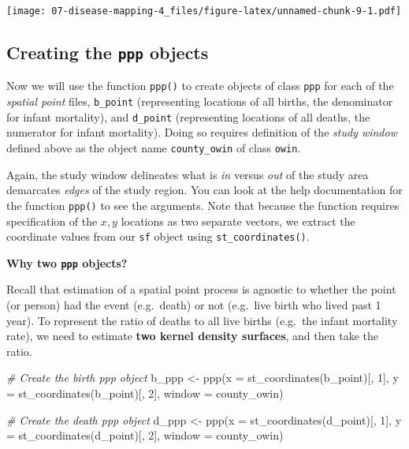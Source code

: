 \documentclass[
]{book}
\newenvironment{Shaded}{\begin{snugshade}}{\end{snugshade}}
\newcommand{\AttributeTok}[1]{\textcolor[rgb]{0.77,0.63,0.00}{#1}}
\newcommand{\CommentTok}[1]{\textcolor[rgb]{0.56,0.35,0.01}{\textit{#1}}}
\newcommand{\DecValTok}[1]{\textcolor[rgb]{0.00,0.00,0.81}{#1}}
\newcommand{\FunctionTok}[1]{\textcolor[rgb]{0.00,0.00,0.00}{#1}}
\newcommand{\NormalTok}[1]{#1}
\newcommand{\OtherTok}[1]{\textcolor[rgb]{0.56,0.35,0.01}{#1}}
\newenvironment{rmdnote}[1]
  {
  \begin{itemize}
  \renewcommand{\labelitemi}{
    \raisebox{-.7\height}[0pt][0pt]{
      {\setkeys{Gin}{width=3em,keepaspectratio}\texttt{[image: images/\#1]}}
    }
  }
  \setlength{\fboxsep}{1em}
  \begin{note}
  \item
  }
  {
  \end{note}
  \end{itemize}
  }
\begin{document}
\texttt{[image: 07-disease-mapping-4\_files/figure-latex/unnamed-chunk-9-1.pdf]}

\hypertarget{creating-the-ppp-objects}{%
\subsection{\texorpdfstring{Creating the \texttt{ppp} objects}{Creating the ppp objects}}\label{creating-the-ppp-objects}}

Now we will use the function \texttt{ppp()} to create objects of class \texttt{ppp} for each of the \emph{spatial point} files, \texttt{b\_point} (representing locations of all births, the denominator for infant mortality), and \texttt{d\_point} (representing locations of all deaths, the numerator for infant mortality). Doing so requires definition of the \emph{study window} defined above as the object name \texttt{county\_owin} of class \texttt{owin}.

Again, the study window delineates what is \emph{in} versus \emph{out} of the study area demarcates \emph{edges} of the study region. You can look at the help documentation for the function \texttt{ppp()} to see the arguments. Note that because the function requires specification of the \(x,y\) locations as two separate vectors, we extract the coordinate values from our \texttt{sf} object using \texttt{st\_coordinates()}.

\begin{rmdnote}{note}
\textbf{Why two \texttt{ppp} objects?}

Recall that estimation of a spatial point process is agnostic to whether the point (or person) had the event (e.g.~death) or not (e.g.~live birth who lived past 1 year). To represent the ratio of deaths to all live births (e.g.~the infant mortality rate), we need to estimate \textbf{two kernel density surfaces}, and then take the ratio.

\end{rmdnote}

\begin{Shaded}
\begin{Highlighting}[]
\CommentTok{\# Create the birth ppp object}
\NormalTok{b\_ppp }\OtherTok{\textless{}{-}} \FunctionTok{ppp}\NormalTok{(}\AttributeTok{x =} \FunctionTok{st\_coordinates}\NormalTok{(b\_point)[, }\DecValTok{1}\NormalTok{], }
             \AttributeTok{y =} \FunctionTok{st\_coordinates}\NormalTok{(b\_point)[, }\DecValTok{2}\NormalTok{],}
             \AttributeTok{window =}\NormalTok{ county\_owin)}

\CommentTok{\# Create the death ppp object}
\NormalTok{d\_ppp }\OtherTok{\textless{}{-}} \FunctionTok{ppp}\NormalTok{(}\AttributeTok{x =} \FunctionTok{st\_coordinates}\NormalTok{(d\_point)[, }\DecValTok{1}\NormalTok{], }
             \AttributeTok{y =} \FunctionTok{st\_coordinates}\NormalTok{(d\_point)[, }\DecValTok{2}\NormalTok{],}
             \AttributeTok{window =}\NormalTok{ county\_owin)}
\end{Highlighting}
\end{Shaded}
\end{document}
